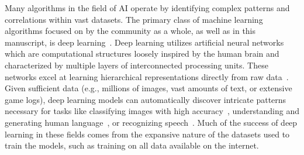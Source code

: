 \documentclass[10pt]{article}
\def\citep#1{}%
\begin{document}
Many algorithms in the field of AI operate by identifying complex patterns and correlations within vast datasets.
The primary class of machine learning algorithms focused on by the community as a whole, as well as in this manuscript, is deep learning~\citep{Goodfellow2016deeplearning, bishop2007, probmlBookMurphy}.
Deep learning utilizes artificial neural networks which are computational structures loosely inspired by the human brain and characterized by multiple layers of interconnected processing units.
These networks excel at learning hierarchical representations directly from raw data~\citep{yosinski2014transferablefeaturesdeepneural, Goodfellow2016deeplearning}.
Given sufficient data (e.g., millions of images, vast amounts of text, or extensive game logs), deep learning models can automatically discover intricate patterns necessary for tasks like classifying images with high accuracy~\citep{krizhevsky2012imagenet, simonyan2015deepconvolutionalnetworkslargescale, he2015deepresiduallearningimage}, understanding and generating human language~\citep{brown2020languagemodelsfewshotlearners, devlin2019bertpretrainingdeepbidirectional, vaswani2023attentionneed}, or recognizing speech~\citep{hintonSpeech2012, gravesspeech2014}. 
Much of the success of deep learning in these fields comes from the expansive nature of the datasets used to train the models, such as training on all data available on the internet.
\end{document}
